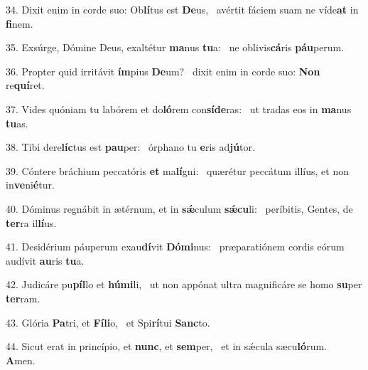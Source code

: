 34. Dixit enim in corde suo: Ob\textbf{lí}tus est \textbf{De}us, \ast\  avértit fáciem suam ne víde\textbf{at} in \textbf{fi}nem.\

35. Exsúrge, Dómine Deus, exaltétur \textbf{ma}nus \textbf{tu}a: \ast\  ne oblivis\textbf{cá}ris \textbf{páu}perum.\

36. Propter quid irritávit \textbf{ím}pius \textbf{De}um? \ast\  dixit enim in corde suo: \textbf{Non} re\textbf{quí}ret.\

37. Vides quóniam tu labórem et do\textbf{ló}rem con\textbf{sí}\textbf{de}ras: \ast\  ut tradas eos in \textbf{ma}nus \textbf{tu}as.\

38. Tibi dere\textbf{líc}tus est \textbf{pau}per: \ast\  órphano tu \textbf{e}ris ad\textbf{jú}tor.\

39. Cóntere bráchium peccatóris \textbf{et} ma\textbf{lí}gni: \ast\  quærétur peccátum illíus, et non in\textbf{ve}ni\textbf{é}tur.\

40. Dóminus regnábit in ætérnum, et in \textbf{sǽ}culum \textbf{sǽ}\textbf{cu}li: \ast\  períbitis, Gentes, de \textbf{ter}ra il\textbf{lí}us.\

41. Desidérium páuperum exau\textbf{dí}vit \textbf{Dó}\textbf{mi}nus: \ast\  præparatiónem cordis eórum audívit \textbf{au}ris \textbf{tu}a.\

42. Judicáre pu\textbf{píl}lo et \textbf{hú}\textbf{mi}li, \ast\  ut non appónat ultra magnificáre se homo \textbf{su}per \textbf{ter}ram.\

43. Glória \textbf{Pa}tri, et \textbf{Fí}\textbf{li}o, \ast\  et Spi\textbf{rí}tui \textbf{Sanc}to.\

44. Sicut erat in princípio, et \textbf{nunc}, et \textbf{sem}per, \ast\  et in sǽcula sæcu\textbf{ló}rum. \textbf{A}men.\

